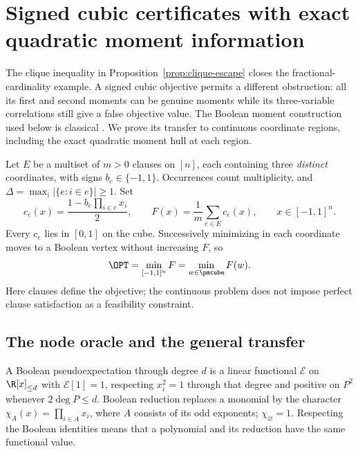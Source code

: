\section{Signed cubic certificates with exact quadratic moment information}
\label{sec:xor-quadratic}
The clique inequality in Proposition~\ref{prop:clique-escape} closes the
fractional-cardinality example. A signed cubic objective permits a different
obstruction: all its first and second moments can be genuine moments while
its three-variable correlations still give a false objective value. The
Boolean moment construction used below is classical
\citep{Schoenebeck2008}. We prove its transfer to continuous coordinate
regions, including the exact quadratic moment hull at each region.

Let $E$ be a multiset of $m>0$ clauses on $[n]$, each containing three
\emph{distinct} coordinates, with signs $b_e\in\{-1,1\}$. Occurrences count
multiplicity, and $\Delta=\max_i|\{e:i\in e\}|\ge1$. Set
\begin{equation}\label{eq:xor-objective}
 c_e(x)=\frac{1-b_e\prod_{i\in e}x_i}{2},\qquad
 F(x)=\frac1m\sum_{e\in E}c_e(x),\qquad x\in[-1,1]^n.
\end{equation}
Every $c_e$ lies in $[0,1]$ on the cube. Successively minimizing in each
coordinate moves to a Boolean vertex without increasing $F$, so
\begin{equation}\label{eq:xor-vertex-min}
 \OPT=\min_{[-1,1]^n}F=\min_{w\in\pmcube}F(w).
\end{equation}
Here clauses define the objective; the continuous problem does not impose
perfect clause satisfaction as a feasibility constraint.

\subsection{The node oracle and the general transfer}
A Boolean pseudoexpectation through degree $d$ is a linear functional
$\mathcal E$ on $\R[x]_{\le d}$ with $\mathcal E[1]=1$, respecting
$x_i^2=1$ through that degree and positive on $P^2$ whenever
$2\deg P\le d$. Boolean reduction replaces a monomial by the character
$\chi_A(x)=\prod_{i\in A}x_i$, where $A$ consists of its odd exponents;
$\chi_\varnothing=1$. Respecting the Boolean identities means that a
polynomial and its reduction have the same functional value.

